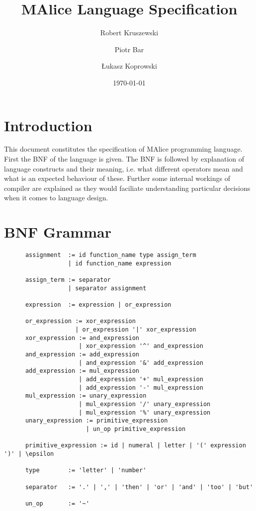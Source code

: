 \documentclass[a4wide, 11pt]{article}
\begin{document}
\title{MAlice Language Specification}

\author{Robert Kruszewski \and Piotr Bar \and Łukasz Koprowski}


\date{\today}         %

\maketitle            %

\section{Introduction}

This document constitutes the specification of MAlice programming language.
First the BNF of the language is given. The BNF is followed by explanation
of language constructs and their meaning, i.e. what different operators mean
and what is an expected behaviour of these. Further some internal workings of compiler
are explained as they would faciliate understanding particular decisions when
it comes to language design.

\section{BNF Grammar} 

\begin{verbatim}
      assignment  := id function_name type assign_term
                  | id function_name expression 

      assign_term := separator
                  | separator assignment

      expression  := expression | or_expression

      or_expression := xor_expression
                    | or_expression '|' xor_expression
      xor_expression := and_expression
                     | xor_expression '^' and_expression 
      and_expression := add_expression
                     | and_expression '&' add_expression
      add_expression := mul_expression
                     | add_expression '+' mul_expression
                     | add_expression '-' mul_expression
      mul_expression := unary_expression
                     | mul_expression '/' unary_expression
                     | mul_expression '%' unary_expression
      unary_expression := primitive_expression
                       | un_op primitive_expression

      primitive_expression := id | numeral | letter | '(' expression ')' | \epsilon

      type        := 'letter' | 'number'

      separator   := '.' | ',' | 'then' | 'or' | 'and' | 'too' | 'but'

      un_op       := '~'
\end{verbatim}
\end{document}
